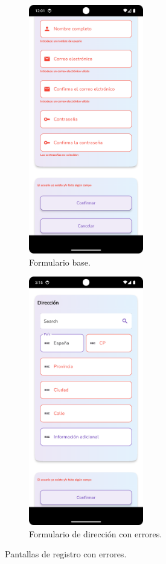 \documentclass[a4paper, 12pt]{article}
\begin{document}
\begin{figure}[H]
   	\begin{subfigure}{0.48\textwidth}
		\begin{center}
			{\includegraphics[width=5cm]{app/RegisterUserError.png}\par}
			\caption{Formulario base.}
		\end{center}  
	\end{subfigure}\hfill
   	\begin{subfigure}{0.48\textwidth}
		\begin{center}
			{\includegraphics[width=5cm]{app/AddressError.png}\par}
			\caption{Formulario de dirección con errores.}
		\end{center}  
	\end{subfigure}\hfill
	\caption{Pantallas de registro con errores.}
\end{figure}
\end{document}
